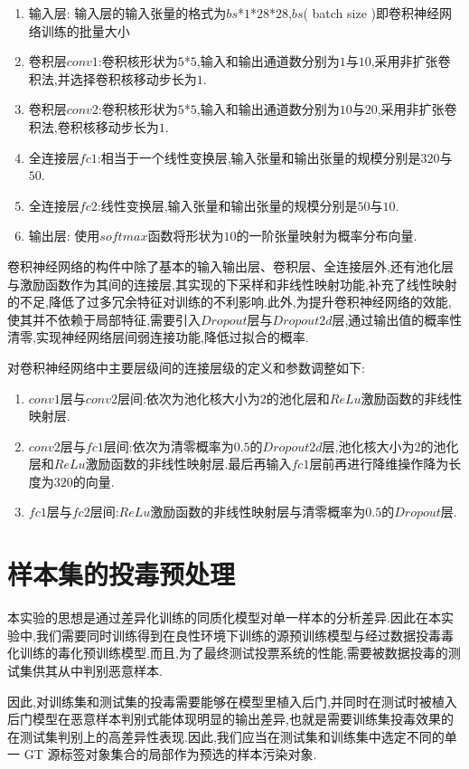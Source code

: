\begin{enumerate}
	\item 输入层: 输入层的输入张量的格式为$bs$*$1$*$28$*$28$,$bs$( batch size )即卷积神经网络训练的批量大小
	\item 卷积层$conv1$:卷积核形状为$5$*$5$,输入和输出通道数分别为$1$与$10$,采用非扩张卷积法,并选择卷积核移动步长为$1$.
	\item 卷积层$conv2$:卷积核形状为$5$*$5$,输入和输出通道数分别为$10$与$20$,采用非扩张卷积法,卷积核移动步长为$1$.
	\item 全连接层$fc1$:相当于一个线性变换层,输入张量和输出张量的规模分别是$320$与$50$.
	\item 全连接层$fc2$:线性变换层,输入张量和输出张量的规模分别是$50$与$10$.
	\item 输出层: 使用$softmax$函数将形状为$10$的一阶张量映射为概率分布向量.
\end{enumerate}

卷积神经网络的构件中除了基本的输入输出层、卷积层、全连接层外,还有池化层与激励函数作为其间的连接层,其实现的下采样和非线性映射功能,补充了线性映射的不足,降低了过多冗余特征对训练的不利影响.此外,为提升卷积神经网络的效能,使其并不依赖于局部特征,需要引入$Dropout$层与$Dropout2d$层,通过输出值的概率性清零,实现神经网络层间弱连接功能,降低过拟合的概率.

对卷积神经网络中主要层级间的连接层级的定义和参数调整如下:

\begin{enumerate}
	\item $conv1$层与$conv2$层间:依次为池化核大小为$2$的池化层和$ReLu$激励函数的非线性映射层.
	\item $conv2$层与$fc1$层间:依次为清零概率为$0.5$的$Dropout2d$层,池化核大小为$2$的池化层和$ReLu$激励函数的非线性映射层.最后再输入$fc1$层前再进行降维操作降为长度为$320$的向量.
	\item $fc1$层与$fc2$层间:$ReLu$激励函数的非线性映射层与清零概率为$0.5$的$Dropout$层.
\end{enumerate}

\section{样本集的投毒预处理}

本实验的思想是通过差异化训练的同质化模型对单一样本的分析差异.因此在本实验中,我们需要同时训练得到在良性环境下训练的源预训练模型与经过数据投毒毒化训练的毒化预训练模型.而且,为了最终测试投票系统的性能,需要被数据投毒的测试集供其从中判别恶意样本.

因此,对训练集和测试集的投毒需要能够在模型里植入后门,并同时在测试时被植入后门模型在恶意样本判别式能体现明显的输出差异,也就是需要训练集投毒效果的在测试集判别上的高差异性表现.因此,我们应当在测试集和训练集中选定不同的单一 GT 源标签对象集合的局部作为预选的样本污染对象.


